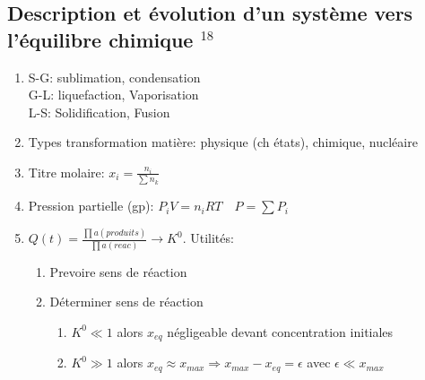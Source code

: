 \documentclass[fleqn]{article}
\theoremstyle{definition} \newtheorem*{defi}{D\'efinition}
\theoremstyle{definition} \newtheorem*{theo}{Th\'eor\`eme}
\theoremstyle{definition} \newtheorem*{coro}{Corollaire}
\theoremstyle{remark} \newtheorem*{rqs}{Remarques}
\theoremstyle{definition} \newtheorem*{prop}{Propri\'et\'e}
\begin{document}
\subsection{Description et \'evolution d'un syst\`eme vers l'\'equilibre chimique $^{18}$}
\begin{enumerate}
	\item S-G: sublimation, condensation\\
		G-L: liquefaction, Vaporisation\\
		L-S: Solidification, Fusion
	\item Types transformation mati\`ere: physique (ch \'etats), chimique, nucl\'eaire
	\item Titre molaire: $x_i = \frac{n_i}{\sum n_k}$
	\item Pression partielle (gp): $P_i V = n_i RT \quad P = \sum P_i$
	\item $Q(t) = \frac{\prod a(produits)}{\prod a(reac)} \rightarrow K^0$. Utilit\'es:
		\begin{enumerate}
			\item Prevoire sens de r\'eaction
			\item D\'eterminer sens de r\'eaction
				\begin{enumerate}
					\item $K^0 \ll 1$ alors $x_{eq}$ n\'egligeable devant concentration initiales
					\item $K^0 \gg 1$ alors $x_{eq} \approx x_{max} \Rightarrow x_{max} - x_{eq} = \epsilon$ avec $\epsilon \ll x_{max}$
				\end{enumerate}
		\end{enumerate}
\end{enumerate}
\end{document}
